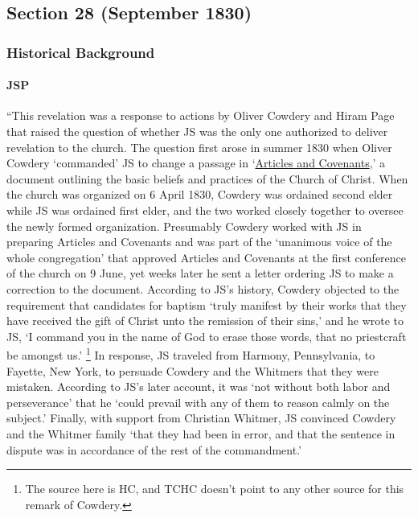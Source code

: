 \subsection{Section 28 (September 1830)}
	\label{DC28}
	
	\subsubsection{Historical Background}
		\label{DC28-HB}
		
		\paragraph{JSP}
		
			``This revelation was a response to actions by Oliver Cowdery and Hiram Page that raised the question of whether JS was the only one authorized to deliver revelation to the church. The question first arose in summer 1830 when Oliver Cowdery `commanded' JS to change a passage in `\hyperref[DC20]{Articles and Covenants},' a document outlining the basic beliefs and practices of the Church of Christ. When the church was organized on 6 April 1830, Cowdery was ordained second elder while JS was ordained first elder, and the two worked closely together to oversee the newly formed organization. Presumably Cowdery worked with JS in preparing Articles and Covenants and was part of the `unanimous voice of the whole congregation' that approved Articles and Covenants at the first conference of the church on 9 June, yet weeks later he sent a letter ordering JS to make a correction to the document. According to JS's history, Cowdery objected to the requirement that candidates for baptism `truly manifest by their works that they have received the gift of Christ unto the remission of their sins,' and he wrote to JS, `I command you in the name of God to erase those words, that no priestcraft be amongst us.'%
				\footnote{%
					The source here is HC, and TCHC doesn't point to any other source for this remark of Cowdery.
					}
			In response, JS traveled from Harmony, Pennsylvania, to Fayette, New York, to persuade Cowdery and the Whitmers that they were mistaken. According to JS's later account, it was `not without both labor and perseverance' that he `could prevail with any of them to reason calmly on the subject.' Finally, with support from Christian Whitmer, JS convinced Cowdery and the Whitmer family `that they had been in error, and that the sentence in dispute was in accordance of the rest of the commandment.'
			
